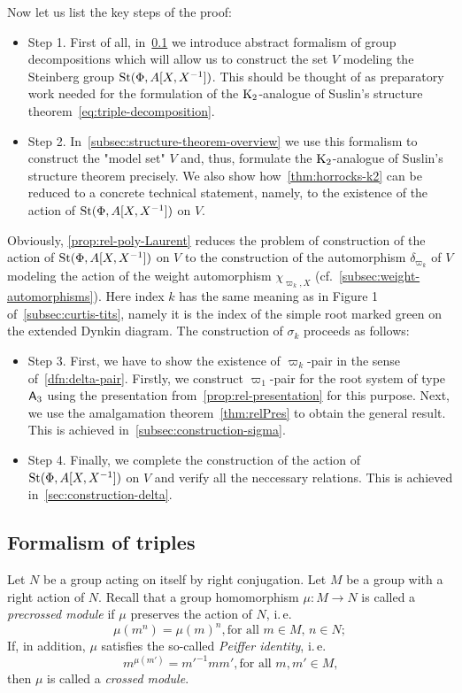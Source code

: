 Now let us list the key steps of the proof:
\begin{itemize}
    \item Step 1. First of all, in~\cref{subsec:triples} we introduce abstract formalism of group decompositions which will allow us to construct the set $V$ modeling the Steinberg group $\operatorname{St}(\Phi, A[X, X^{-1}])$.
                  This should be thought of as preparatory work needed for the formulation of the $\operatorname{K}_2$-analogue of Suslin's structure theorem~\eqref{eq:triple-decomposition}.
    \item Step 2. In~\cref{subsec:structure-theorem-overview} we use this formalism to construct the "model set" $V$ and, thus, formulate the $\operatorname{K}_2$-analogue of Suslin's structure theorem precisely.
                  We also show how~\cref{thm:horrocks-k2} can be reduced to a concrete technical statement, namely,
                  to the existence of the action of $\operatorname{St}(\Phi, A[X, X^{-1}])$ on $V$.
\end{itemize}
Obviously, \cref{prop:rel-poly-Laurent} reduces the problem of construction of the action of $\operatorname{St}(\Phi, A[X, X^{-1}])$ on $V$ to the construction of
 the automorphism $\delta_{\varpi_k}$ of $V$ modeling the action of the weight automorphism $\chi_{\varpi_k, X}$ (cf.~\cref{subsec:weight-automorphisms}).
Here index $k$ has the same meaning as in Figure 1 of~\cref{subsec:curtis-tits}, namely it is the index of the simple root marked green on the extended Dynkin diagram.
The construction of $\sigma_k$ proceeds as follows:
\begin{itemize}
    \item Step 3. First, we have to show the existence of $\varpi_k$-pair in the sense of~\cref{dfn:delta-pair}.
                  Firstly, we construct $\varpi_1$-pair for the root system of type $\mathsf{A}_3$ using the presentation from~\cref{prop:rel-presentation} for this purpose.
                  Next, we use the amalgamation theorem~\cref{thm:relPres} to obtain the general result.
                  This is achieved in~\cref{subsec:construction-sigma}.
    \item Step 4. Finally, we complete the construction of the action of $\operatorname{St}(\Phi, A[X, X^{-1}])$ on $V$ and verify all the neccessary relations.
                  This is achieved in~\cref{sec:construction-delta}.
\end{itemize}

\subsection{Formalism of triples}\label{subsec:triples}
Let $N$ be a group acting on itself by right conjugation.
Let $M$ be a group with a right action of $N$.
Recall that a group homomorphism $\mu\colon M \to N$ is called a \textit{precrossed module} if $\mu$ preserves the action of $N$, i.\,e.
\[\mu(m^n) = \mu(m)^n, \text{for all $m \in M$, $n\in N;$} \]
If, in addition, $\mu$ satisfies the so-called \textit{Peiffer identity}, i.\,e.
\[{m}^{\mu(m')} = {m'}^{-1} m m', \text{for all $m, m' \in M$,}\]
then $\mu$ is called a \textit{crossed module}.

